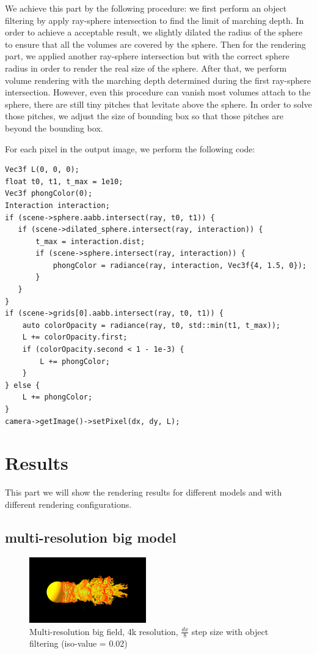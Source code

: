 \documentclass[acmtog]{acmart}
\begin{document}
    We achieve this part by the following procedure: we first perform an object filtering by apply ray-sphere intersection to find the limit of marching depth.
    In order to achieve a acceptable result, we slightly dilated the radius of the sphere to ensure that all the volumes are covered by the sphere.
    Then for the rendering part, we applied another ray-sphere intersection but with the correct sphere radius in order to render the real size of the sphere.
    After that, we perform volume rendering with the marching depth determined during the first ray-sphere intersection.
    However, even this procedure can vanish most volumes attach to the sphere, there are still tiny pitches that levitate above the sphere.
    In order to solve those pitches, we adjust the size of bounding box so that those pitches are beyond the bounding box.

    For each pixel in the output image, we perform the following code:
    \begin{lstlisting}[label={lst:lstlisting3}]
Vec3f L(0, 0, 0);
float t0, t1, t_max = 1e10;
Vec3f phongColor(0);
Interaction interaction;
if (scene->sphere.aabb.intersect(ray, t0, t1)) {
   if (scene->dilated_sphere.intersect(ray, interaction)) {
       t_max = interaction.dist;
       if (scene->sphere.intersect(ray, interaction)) {
           phongColor = radiance(ray, interaction, Vec3f{4, 1.5, 0});
       }
   }
}
if (scene->grids[0].aabb.intersect(ray, t0, t1)) {
    auto colorOpacity = radiance(ray, t0, std::min(t1, t_max));
    L += colorOpacity.first;
    if (colorOpacity.second < 1 - 1e-3) {
        L += phongColor;
    }
} else {
    L += phongColor;
}
camera->getImage()->setPixel(dx, dy, L);
    \end{lstlisting}


    \section{Results}\label{sec:results}
    This part we will show the rendering results for different models and with different rendering configurations.

    \subsection{multi-resolution big model}\label{subsec:multi-resolution-big-model}
    \begin{figure}[H]
        \centering
        \includegraphics[width=0.45\textwidth]{./image/multi_big_4k_8_filter_0.02}
        \caption{Multi-resolution big field, 4k resolution, $ \frac{dx}{8} $ step size with object filtering (iso-value = 0.02)}\label{fig:figure1}
    \end{figure}
\end{document}
